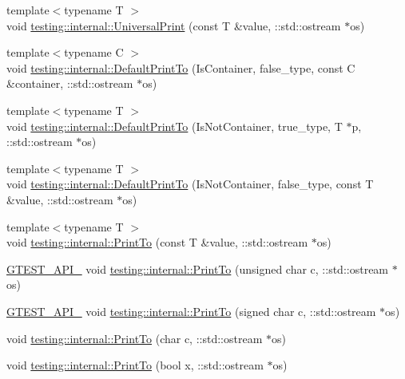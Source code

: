 \begin{DoxyCompactItemize}
\item 
{\footnotesize template$<$typename T $>$ }\\void \mbox{\hyperlink{namespacetesting_1_1internal_a30708fa2bacf11895b03bdb21eb72309}{testing\+::internal\+::\+Universal\+Print}} (const T \&value, \+::std\+::ostream $\ast$os)
\item 
{\footnotesize template$<$typename C $>$ }\\void \mbox{\hyperlink{namespacetesting_1_1internal_ac7dfe02c4c1cbfe89c23a93d873079c5}{testing\+::internal\+::\+Default\+Print\+To}} (Is\+Container, false\+\_\+type, const C \&container, \+::std\+::ostream $\ast$os)
\item 
{\footnotesize template$<$typename T $>$ }\\void \mbox{\hyperlink{namespacetesting_1_1internal_affa1f94e3ba8db8b964553c2871bf339}{testing\+::internal\+::\+Default\+Print\+To}} (Is\+Not\+Container, true\+\_\+type, T $\ast$p, \+::std\+::ostream $\ast$os)
\item 
{\footnotesize template$<$typename T $>$ }\\void \mbox{\hyperlink{namespacetesting_1_1internal_a78e4937ba564f01dac2ff25f3eece0ec}{testing\+::internal\+::\+Default\+Print\+To}} (Is\+Not\+Container, false\+\_\+type, const T \&value, \+::std\+::ostream $\ast$os)
\item 
{\footnotesize template$<$typename T $>$ }\\void \mbox{\hyperlink{namespacetesting_1_1internal_adb3c27150dbe661db0e0c4be27533460}{testing\+::internal\+::\+Print\+To}} (const T \&value, \+::std\+::ostream $\ast$os)
\item 
\mbox{\hyperlink{gtest-port_8h_aa73be6f0ba4a7456180a94904ce17790}{G\+T\+E\+S\+T\+\_\+\+A\+P\+I\+\_\+}} void \mbox{\hyperlink{namespacetesting_1_1internal_aa7e70a85d66f0c109e3e69629ef577f2}{testing\+::internal\+::\+Print\+To}} (unsigned char c, \+::std\+::ostream $\ast$os)
\item 
\mbox{\hyperlink{gtest-port_8h_aa73be6f0ba4a7456180a94904ce17790}{G\+T\+E\+S\+T\+\_\+\+A\+P\+I\+\_\+}} void \mbox{\hyperlink{namespacetesting_1_1internal_abf6c518b437569187c1218166c702807}{testing\+::internal\+::\+Print\+To}} (signed char c, \+::std\+::ostream $\ast$os)
\item 
void \mbox{\hyperlink{namespacetesting_1_1internal_a476bd3d411d4f129620aaf8999c257c0}{testing\+::internal\+::\+Print\+To}} (char c, \+::std\+::ostream $\ast$os)
\item 
void \mbox{\hyperlink{namespacetesting_1_1internal_a2979ac1ad3e05c51dcd7dca2eb34e6ce}{testing\+::internal\+::\+Print\+To}} (bool x, \+::std\+::ostream $\ast$os)

\end{DoxyCompactItemize}
